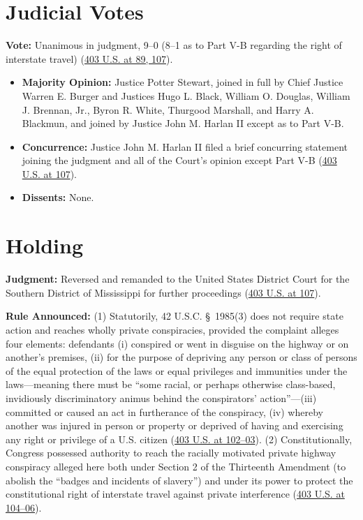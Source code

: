 \documentclass[12pt]{article}
\begin{document}
\section{Judicial Votes}

\textbf{Vote:} Unanimous in judgment, 9--0 (8--1 as to Part V-B regarding the right of interstate travel) (\href{https://supreme.justia.com/cases/federal/us/403/88/}{403 U.S. at 89, 107}).

\begin{itemize}
\item \textbf{Majority Opinion:} Justice Potter Stewart, joined in full by Chief Justice Warren E. Burger and Justices Hugo L. Black, William O. Douglas, William J. Brennan, Jr., Byron R. White, Thurgood Marshall, and Harry A. Blackmun, and joined by Justice John M. Harlan II except as to Part V-B.
\item \textbf{Concurrence:} Justice John M. Harlan II filed a brief concurring statement joining the judgment and all of the Court's opinion except Part V-B (\href{https://supreme.justia.com/cases/federal/us/403/88/}{403 U.S. at 107}).
\item \textbf{Dissents:} None.
\end{itemize}

\section{Holding}

\textbf{Judgment:} Reversed and remanded to the United States District Court for the Southern District of Mississippi for further proceedings (\href{https://supreme.justia.com/cases/federal/us/403/88/}{403 U.S. at 107}).

\textbf{Rule Announced:} (1) Statutorily, 42 U.S.C. \S~1985(3) does not require state action and reaches wholly private conspiracies, provided the complaint alleges four elements: defendants (i) conspired or went in disguise on the highway or on another's premises, (ii) for the purpose of depriving any person or class of persons of the equal protection of the laws or equal privileges and immunities under the laws---meaning there must be ``some racial, or perhaps otherwise class-based, invidiously discriminatory animus behind the conspirators' action''---(iii) committed or caused an act in furtherance of the conspiracy, (iv) whereby another was injured in person or property or deprived of having and exercising any right or privilege of a U.S. citizen (\href{https://supreme.justia.com/cases/federal/us/403/88/}{403 U.S. at 102--03}). (2) Constitutionally, Congress possessed authority to reach the racially motivated private highway conspiracy alleged here both under Section 2 of the Thirteenth Amendment (to abolish the ``badges and incidents of slavery'') and under its power to protect the constitutional right of interstate travel against private interference (\href{https://supreme.justia.com/cases/federal/us/403/88/}{403 U.S. at 104--06}).
\end{document}
